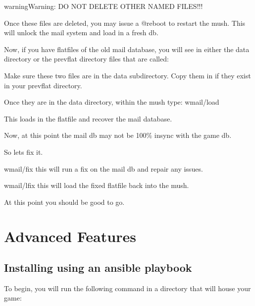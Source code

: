 \documentclass[letterpaper,10pt,english]{sphinxmanual}
\begin{document}
\begin{sphinxadmonition}{warning}{Warning:}
\sphinxAtStartPar
DO NOT DELETE OTHER NAMED FILES!!!
\end{sphinxadmonition}

\sphinxAtStartPar
Once these files are deleted, you may issue a @reboot to restart the mush.
This will unlock the mail system and load in a fresh db.

\sphinxAtStartPar
Now, if you have flatfiles of the old mail database, you will see in either
the \textquotesingle{}data\textquotesingle{} directory or the \textquotesingle{}prevflat\textquotesingle{} directory files that are called:

\begin{sphinxVerbatim}[commandchars=\\\{\}]
\end{sphinxVerbatim}

\sphinxAtStartPar
Make sure these two files are in the \textquotesingle{}data\textquotesingle{} subdirectory.  Copy them in
if they exist in your \textquotesingle{}prevflat\textquotesingle{} directory.

\sphinxAtStartPar
Once they are in the \textquotesingle{}data\textquotesingle{} directory, within the mush type: wmail/load

\sphinxAtStartPar
This loads in the flatfile and recover the mail database.

\sphinxAtStartPar
Now, at this point the mail db may not be 100\% in\sphinxhyphen{}sync with the game db.

\sphinxAtStartPar
So let\textquotesingle{}s fix it.

\sphinxAtStartPar
wmail/fix   \sphinxhyphen{}\sphinxhyphen{} this will run a fix on the mail db and repair any issues.

\sphinxAtStartPar
wmail/lfix  \sphinxhyphen{}\sphinxhyphen{} this will load the fixed flatfile back into the mush.

\sphinxAtStartPar
At this point you should be good to go.


\chapter{Advanced Features}
\label{\detokenize{advanced:advanced-features}}\label{\detokenize{advanced::doc}}

\section{Installing using an ansible playbook}
\label{\detokenize{advanced:installing-using-an-ansible-playbook}}\label{\detokenize{advanced:ansible-install}}
\sphinxAtStartPar
To begin, you will run the following command in a directory that will house your game:
\end{document}
